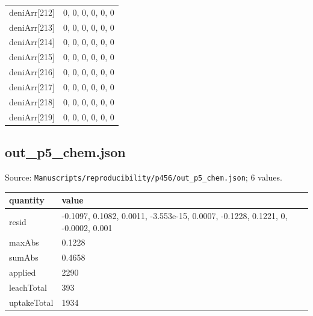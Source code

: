 {\begin{longtable}{p{}p{}}
{}deniArr[212] & 0, 0, 0, 0, 0, 0\\
{}deniArr[213] & 0, 0, 0, 0, 0, 0\\
{}deniArr[214] & 0, 0, 0, 0, 0, 0\\
{}deniArr[215] & 0, 0, 0, 0, 0, 0\\
{}deniArr[216] & 0, 0, 0, 0, 0, 0\\
{}deniArr[217] & 0, 0, 0, 0, 0, 0\\
{}deniArr[218] & 0, 0, 0, 0, 0, 0\\
{}deniArr[219] & 0, 0, 0, 0, 0, 0\\
\bottomrule\end{longtable}}

\subsection*{out\_p5\_chem.json}
\noindent\small Source: \nolinkurl{Manuscripts/reproducibility/p456/out_p5_chem.json}; 6 values.\par
{\scriptsize\begin{longtable}{p{}p{}}\toprule\textbf{quantity} & \textbf{value}\\\midrule\endhead
{}resid & -0.1097, 0.1082, 0.0011, -3.553e-15, 0.0007, -0.1228, 0.1221, 0, -0.0002, 0.001\\
{}maxAbs & 0.1228\\
{}sumAbs & 0.4658\\
{}applied & 2290\\
{}leachTotal & 393\\
{}uptakeTotal & 1934\\
\bottomrule\end{longtable}}

